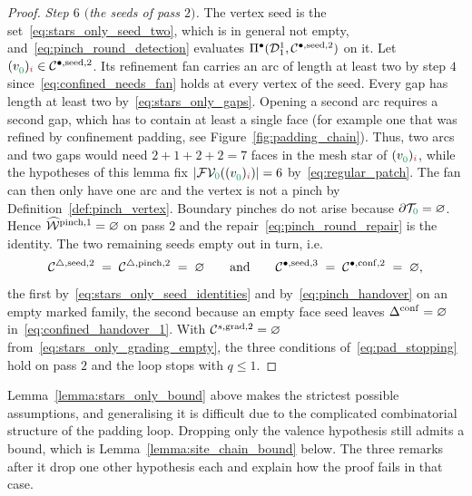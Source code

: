 \documentclass[a4paper, 12pt]{article}
\makeatletter
\newcommand{\detectV}{\Pi^{\bullet}}                             %
\DeclareRobustCommand{\candV}[1][]{\mathcal{C}^{\bullet\ifx\@empty#1\@empty\else,#1\fi}}
\DeclareRobustCommand{\candF}[1][]{\mathcal{C}^{\triangle\ifx\@empty#1\@empty\else,#1\fi}}
\DeclareRobustCommand{\candC}[1][]{\mathcal{C}^{s\ifx\@empty#1\@empty\else,#1\fi}}
\newcommand{\green}{\color{ForestGreen}}
\newcommand{\brickred}{\color{BrickRed}}
\newcommand{\T}{\mathcal{T}}
\newcommand{\V}{\mathcal{V}}
\newcommand{\F}{\mathcal{F}}
\DeclareRobustCommand{\simplexsubsetTwo}[2][]{\Delta\ifx\@empty#1\@empty\else^{#1}\fi_{#2}}
\newcommand{\vertex}[2]{\freeQ{v}{}{#1}{#2}}
\DeclareRobustCommand{\markedVertexClasses}[1][]{\widehat{\mathcal{W}}\ifx\@empty#1\@empty\else^{#1}\fi}
\newcommand{\FVl}[1]{\F\V_{#1}}
\newcommand{\coarseIdxone}{{\brickred i}}
\newcommand{\lzero}{{\green 0}}
\newcommand{\freeQ}[4]{ ( {#1}^{#2}_{#3} )_{#4}}
\theoremstyle{definition}
\theoremstyle{plain}
\numberwithin{equation}{section}
\DeclareRobustCommand{\domseq}[1][]{\mathcal{D}\ifx\@empty#1\@empty\else_{#1}\fi}
\makeatother
\begin{document}
\begin{proof}
    \emph{Step $6$ $($the seeds of pass $2)$.} The vertex seed is the set~\eqref{eq:stars_only_seed_two}, which is in general not empty, and~\eqref{eq:pinch_round_detection} evaluates $\detectV(\domseq[1]^{1}, \candV[\mathrm{seed},2])$ on it. Let $\vertex{\lzero}{\coarseIdxone} \in \candV[\mathrm{seed},2]$. Its refinement fan carries an arc of length at least two by step $4$ since~\eqref{eq:confined_needs_fan} holds at every vertex of the seed. Every gap has length at least two by~\eqref{eq:stars_only_gaps}. Opening a second arc requires a second gap, which has to contain at least a single face (for example one that was refined by confinement padding, see Figure~\ref{fig:padding_chain}). Thus, two arcs and two gaps would need $2 \! + \! 1 \! + \! 2 \! + \! 2 = 7$ faces in the mesh star of $\vertex{\lzero}{\coarseIdxone}$, while the hypotheses of this lemma fix $\vert \FVl{\lzero}(\vertex{\lzero}{\coarseIdxone}) \vert = 6$ by~\eqref{eq:regular_patch}. The fan can then only have one arc and the vertex is not a pinch by Definition~\ref{def:pinch_vertex}. Boundary pinches do not arise because $\partial \T_\lzero = \varnothing$. Hence $\markedVertexClasses[\mathrm{pinch},1] = \varnothing$ on pass $2$ and the repair~\eqref{eq:pinch_round_repair} is the identity. The two remaining seeds empty out in turn, i.e.
    \begin{equation}
        \label{eq:stars_only_seeds_two}
        \candF[\mathrm{seed},2] \; = \; \candF[\mathrm{pinch},2] \; = \; \varnothing
        \qquad \text{and} \qquad
        \candV[\mathrm{seed},3] \; = \; \candV[\mathrm{conf},2] \; = \; \varnothing ,
    \end{equation}
    the first by~\eqref{eq:stars_only_seed_identities} and by~\eqref{eq:pinch_handover} on an empty marked family, the second because an empty face seed leaves $\simplexsubsetTwo[\mathrm{conf}]{} = \varnothing$ in~\eqref{eq:confined_handover_1}. With $\candC[\mathrm{grad},2] = \varnothing$ from~\eqref{eq:stars_only_grading_empty}, the three conditions of~\eqref{eq:pad_stopping} hold on pass $2$ and the loop stops with $q \leq 1$.
\end{proof}

Lemma~\ref{lemma:stars_only_bound} above makes the strictest possible assumptions, and generalising it is difficult due to the complicated combinatorial structure of the padding loop. Dropping only the valence hypothesis still admits a bound, which is Lemma~\ref{lemma:site_chain_bound} below. The three remarks after it drop one other hypothesis each and explain how the proof fails in that case.
\end{document}
